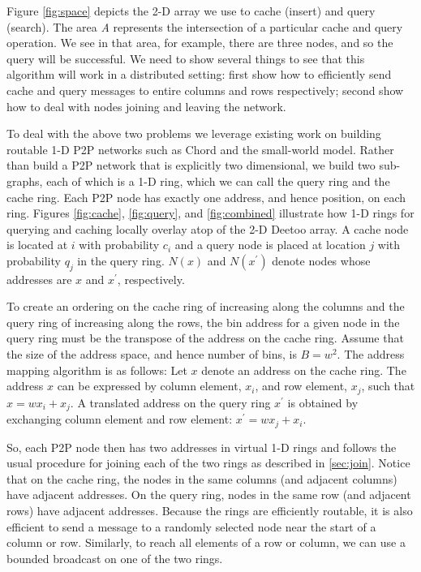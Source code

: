 \documentclass[conference]{IEEEtran}
\begin{document}
Figure \ref{fig:space} depicts the 2-D array we use to cache (insert)
and query (search).  The area \textit{A} represents the
intersection of a particular cache and query operation.  We see in that
area, for example, there are three nodes, and so the query will be successful.  We need to
show several things to see that this algorithm will work in a distributed
setting: first show how to efficiently send cache and query messages to entire columns
and rows respectively; second show how to deal with nodes joining and leaving the network.

To deal with the above two problems we leverage existing work on building
routable 1-D P2P networks such as Chord\cite{is:Chord} and the small-world
model\cite{jk:Algorithmic}.  Rather than build a P2P network that is
explicitly two dimensional, we build two sub-graphs, each of which is a 1-D 
ring, which we can call the query ring and the cache ring.  Each P2P 
node has exactly one address, and hence position, on each ring.  
Figures \ref{fig:cache}, \ref{fig:query}, and \ref{fig:combined} 
illustrate how  1-D rings for querying and caching 
locally overlay atop of the 2-D Deetoo array.
A cache node is located at $i$ with probability $c_{i}$ and a
query node is placed at location $j$ with probability $q_{j}$ in the query ring. 
$N(x)$ and $N(x^\prime)$ denote nodes whose addresses are $x$ and $x^\prime$, respectively.

To create an ordering on the cache ring of increasing
along the columns and the query ring of increasing along the rows, the bin
address for a given node in the query ring must be the transpose of the
address on the cache ring.  
Assume that the size of the address space,
and hence number of bins, is $B=w^2$.
The address mapping algorithm is as
follows: Let $x$ denote an address on the cache ring. The address
$x$ can be expressed by
column element, $x_{i}$, and row element, $x_{j}$, such
that $x = w x_i + x_j$.
A translated address on the query ring $x^\prime$ is obtained by exchanging
column element and row element:
$x^\prime = w x_{j} +x_{i}$.

So, each P2P node then has two addresses in virtual 1-D rings and follows the usual
procedure for joining each of the two rings as described in \ref{sec:join}.
Notice that on the cache ring, the nodes in the same columns (and adjacent
columns) have adjacent addresses.  On the query ring, nodes in the same row
(and adjacent rows) have adjacent addresses.  Because the rings are efficiently
routable, it is also efficient to send a message to a randomly selected node near
the start of a column or row.  Similarly, to reach all elements of a row or
column, we can use a bounded broadcast on one of the two rings.  
\end{document}
